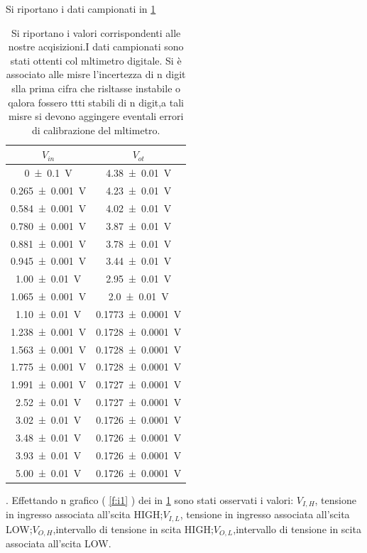 	Si riportano i dati campionati in \tablename{ \ref{t:1}}
		\begin{table}[hb]
		\centering
		\begin{tabular}{|c|c|}
			\toprule
			$V_{in}$  & 	$V_{ot}$ \\
			\midrule
			\SI{0 \pm 0.1}{\volt} & \SI{4.38 \pm 0.01}{\volt}\\
			\SI{0.265 \pm 0.001}{\volt} & \SI{4.23 \pm 0.01}{\volt}\\
			\SI{0.584 \pm 0.001}{\volt} & \SI{4.02 \pm 0.01}{\volt}\\
			\SI{0.780 \pm 0.001}{\volt} & \SI{3.87 \pm 0.01}{\volt}\\
			\SI{0.881 \pm 0.001}{\volt} & \SI{3.78 \pm 0.01}{\volt}\\
			\SI{0.945 \pm 0.001}{\volt} & \SI{3.44 \pm 0.01}{\volt}\\
			\SI{1.00 \pm 0.01}{\volt} & \SI{2.95 \pm 0.01}{\volt}\\
			\SI{1.065 \pm 0.001}{\volt} & \SI{2.0 \pm 0.01}{\volt}\\
			\SI{1.10 \pm 0.01}{\volt} & \SI{0.1773 \pm 0.0001}{\volt}\\
			\SI{1.238 \pm 0.001}{\volt} & \SI{0.1728 \pm 0.0001}{\volt}\\
			\SI{1.563 \pm 0.001}{\volt} & \SI{0.1728 \pm 0.0001}{\volt}\\
			\SI{1.775 \pm 0.001}{\volt} & \SI{0.1728 \pm 0.0001}{\volt}\\
			\SI{1.991 \pm 0.001}{\volt} & \SI{0.1727 \pm 0.0001}{\volt}\\
			\SI{2.52 \pm 0.01}{\volt} & \SI{0.1727 \pm 0.0001}{\volt}\\
			\SI{3.02 \pm 0.01}{\volt} & \SI{0.1726 \pm 0.0001}{\volt}\\
			\SI{3.48 \pm 0.01}{\volt} & \SI{0.1726 \pm 0.0001}{\volt}\\
			\SI{3.93 \pm 0.01}{\volt} & \SI{0.1726 \pm 0.0001}{\volt}\\
			\SI{5.00 \pm 0.01}{\volt} & \SI{0.1726 \pm 0.0001}{\volt}\\
			\bottomrule
		\end{tabular}
		\caption{Si riportano i valori corrispondenti alle nostre acqisizioni.I dati campionati sono stati ottenti col mltimetro digitale.
		Si è associato alle misre l'incertezza di n  digit slla prima cifra che risltasse instabile o qalora fossero ttti stabili di n digit,a tali misre si devono aggingere eventali errori di calibrazione del mltimetro.}
		\label{t:1}
	\end{table}
	.
	Effettando n grafico  ( \figurename{ \ref{f:i1}} )
	 dei in  \tablename{ \ref{t:1}} sono stati osservati i valori:
	 $V_{I,H}$, tensione in ingresso associata all'scita HIGH;$V_{I,L}$, tensione in ingresso associata all'scita LOW;$V_{O,H}$,intervallo di tensione in scita   HIGH;$V_{O,L}$,intervallo di tensione in scita associata all'scita LOW.
	 

